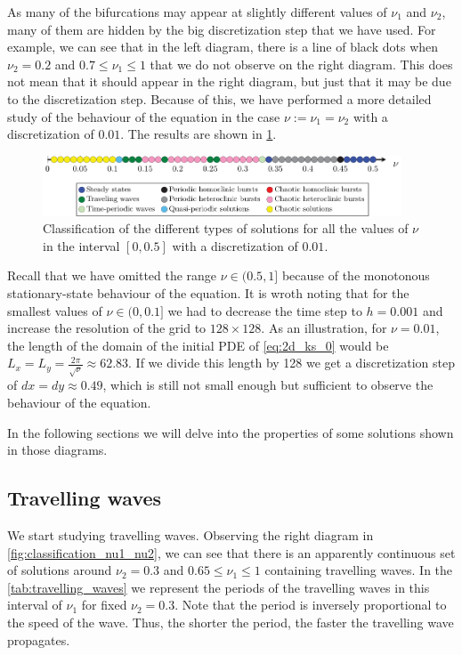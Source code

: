 \documentclass[twoside]{article}
\begin{document}
As many of the bifurcations may appear at slightly different values of $\nu_1$ and $\nu_2$, many of them are hidden by the big discretization step that we have used. For example, we can see that in the left diagram, there is a line of black dots when $\nu_2=0.2$ and $0.7\leq \nu_1 \leq 1$ that we do not observe on the right diagram. This does not mean that it should appear in the right diagram, but just that it may be due to the discretization step. Because of this, we have performed a more detailed study of the behaviour of the equation in the case $\nu:=\nu_1=\nu_2$ with a discretization of $0.01$. The results are shown in \cref{fig:classification_nu}.

\begin{figure}[ht]
  \centering
  \includegraphics[width=0.95\textwidth]{images/nu1=nu2.pdf}
  \caption{Classification of the different types of solutions for all the values of $\nu$ in the interval $[0,0.5]$ with a discretization of $0.01$.}
  \label{fig:classification_nu}
\end{figure}

Recall that we have omitted the range $\nu\in(0.5,1]$ because of the monotonous stationary-state behaviour of the equation. It is wroth noting that for the smallest values of $\nu\in(0,0.1]$ we had to decrease the time step to $h=0.001$ and increase the resolution of the grid to $128\times 128$. As an illustration, for $\nu=0.01$, the length of the domain of the initial PDE of \cref{eq:2d_ks_0} would be $L_x=L_y=\frac{2\pi}{\sqrt{\nu}}\approx 62.83$. If we divide this length by 128 we get a discretization step of $dx=dy\approx 0.49$, which is still not small enough but sufficient to observe the behaviour of the equation.

In the following sections we will delve into the properties of some solutions shown in those diagrams.
\subsection{Travelling waves}\label{sec:travelling_waves}
We start studying travelling waves. Observing the right diagram in \cref{fig:classification_nu1_nu2}, we can see that there is an apparently continuous set of solutions around $\nu_2=0.3$ and $0.65\leq \nu_1\leq 1$ containing travelling waves. In the \cref{tab:travelling_waves} we represent the periods of the travelling waves in this interval of $\nu_1$ for fixed $\nu_2=0.3$. Note that the period is inversely proportional to the speed of the wave. Thus, the shorter the period, the faster the travelling wave propagates.
\end{document}
